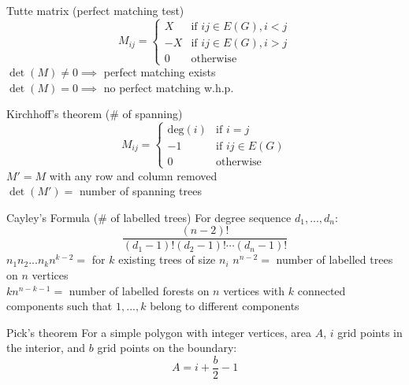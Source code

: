 
\begin{misc}{Tutte matrix (perfect matching test)}
	\begin{equation*}
		M_{ij} =
			\begin{cases}
				X & \text{if } ij \in E(G), i < j \\
				-X & \text{if } ij \in E(G), i > j \\
				0 & \text{otherwise}
			\end{cases}
	\end{equation*}
	$\det(M) \neq 0 \implies $ perfect matching exists \\
	$\det(M) = 0 \implies $ no perfect matching w.h.p. \\
\end{misc}

\begin{misc}{Kirchhoff's theorem (\# of spanning)}
	\begin{equation*}
		M_{ij} =
			\begin{cases}
				\text{deg}(i) & \text{if } i = j \\
				-1 & \text{if } ij \in E(G) \\
				0 & \text{otherwise}
			\end{cases}
	\end{equation*}
	$M' = M$ with any row and column removed \\
	$\det(M') = $ number of spanning trees
\end{misc}

\begin{misc}{Cayley's Formula (\# of labelled trees)}
	For degree sequence $d_1, ..., d_n$:
	\begin{equation*}
		\frac{(n-2)!}{(d_1 - 1)!(d_2 - 1)! \cdots (d_n - 1)!}
	\end{equation*}
	$n_1n_2...n_kn^{k-2} =$ for $k$ existing trees of size $n_i$
	$n^{n-2} = $ number of labelled trees on $n$ vertices \\
	$kn^{n-k-1} = $ number of labelled forests on $n$ vertices with $k$ connected components such that $1, ..., k$ belong to different components
\end{misc}

\begin{misc}{Pick's theorem}
	For a simple polygon with integer vertices, area $A$, $i$ grid points in the interior, and $b$ grid points on the boundary:
	\begin{equation*}
		A=i+\frac{b}{2}-1
	\end{equation*}
\end{misc}

